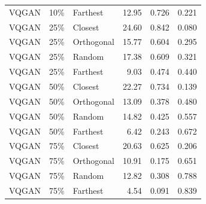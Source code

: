 \begin{longtable}{lllrrr}
VQGAN & 10\% & Farthest & 12.95 & 0.726 & 0.221 \\
VQGAN & 25\% & Closest & 24.60 & 0.842 & 0.080 \\
VQGAN & 25\% & Orthogonal & 15.77 & 0.604 & 0.295 \\
VQGAN & 25\% & Random & 17.38 & 0.609 & 0.321 \\
VQGAN & 25\% & Farthest & 9.03 & 0.474 & 0.440 \\
VQGAN & 50\% & Closest & 22.27 & 0.734 & 0.139 \\
VQGAN & 50\% & Orthogonal & 13.09 & 0.378 & 0.480 \\
VQGAN & 50\% & Random & 14.82 & 0.425 & 0.557 \\
VQGAN & 50\% & Farthest & 6.42 & 0.243 & 0.672 \\
VQGAN & 75\% & Closest & 20.63 & 0.625 & 0.206 \\
VQGAN & 75\% & Orthogonal & 10.91 & 0.175 & 0.651 \\
VQGAN & 75\% & Random & 12.82 & 0.308 & 0.788 \\
VQGAN & 75\% & Farthest & 4.54 & 0.091 & 0.839 \\
\end{longtable}
\endgroup

